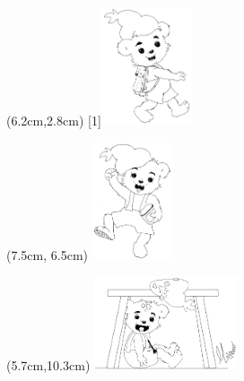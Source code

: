 \begin{textblock*}{3cm}(6.2cm,2.8cm) %
    \scalebox{-1}[1]{\includegraphics[width=2.7cm]{./bilder/majas-bilder/bamse-1.png}}
\end{textblock*}

\begin{textblock*}{3cm}(7.5cm, 6.5cm) %
    \includegraphics[width=2.4cm]{./bilder/majas-bilder/bamse-2.png}
\end{textblock*}

\begin{textblock*}{3cm}(5.7cm,10.3cm) %
    \includegraphics[width=4.2cm]{./bilder/majas-bilder/bamse-3.png}
\end{textblock*}

